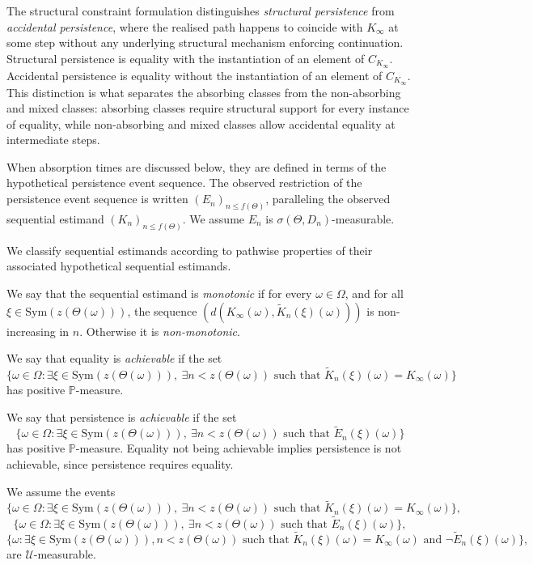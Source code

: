\documentclass{article}
\newcommand{\1}{\mathbbm{1}}
\begin{document}
The structural constraint formulation distinguishes \textit{structural persistence} from \textit{accidental persistence}, where the realised path happens to coincide with $K_\infty$ at some step without any underlying structural mechanism enforcing continuation. Structural persistence is equality with the instantiation of an element of $C_{K_\infty}$. Accidental persistence is equality without the instantiation of an element of $C_{K_\infty}$. This distinction is what separates the absorbing classes from the non-absorbing and mixed classes: absorbing classes require structural support for every instance of equality, while non-absorbing and mixed classes allow accidental equality at intermediate steps.

When absorption times are discussed below, they are defined in terms of the hypothetical persistence event sequence. The observed restriction of the persistence event sequence is written $(E_n)_{n \le f(\Theta)}$, paralleling the observed sequential estimand $(K_n)_{n \le f(\Theta)}$. We assume $E_n$ is $\sigma(\Theta,D_n)$-measurable.

We classify sequential estimands according to pathwise properties of their associated hypothetical sequential estimands.

We say that the sequential estimand is \textit{monotonic} if for every $\omega \in \Omega$, and for all $\xi \in \mathrm{Sym}(z(\Theta(\omega)))$, the sequence $(d(K_\infty(\omega), \widetilde K_n(\xi)(\omega)))$ is non-increasing in $n$. Otherwise it is \textit{non-monotonic}.

We say that equality is \textit{achievable} if the set
\[
\{\omega \in \Omega : \exists \xi \in \mathrm{Sym}(z(\Theta(\omega))),\ \exists n < z(\Theta(\omega)) \text{ such that } \widetilde K_n(\xi)(\omega) = K_\infty(\omega)\}
\]
has positive $\mathbb{P}$-measure.

We say that persistence is \textit{achievable} if the set
\[
\{\omega \in \Omega : \exists \xi \in \mathrm{Sym}(z(\Theta(\omega))),\ \exists n < z(\Theta(\omega)) \text{ such that } \widetilde E_n(\xi)(\omega)\}
\]
has positive $\mathbb{P}$-measure. Equality not being achievable implies persistence is not achievable, since persistence requires equality. 

We assume the events \[
\{\omega \in \Omega : \exists \xi \in \mathrm{Sym}(z(\Theta(\omega))),\ \exists n < z(\Theta(\omega)) \text{ such that } \widetilde K_n(\xi)(\omega) = K_\infty(\omega)\}, 
\]
\[
\{\omega \in \Omega : \exists \xi \in \mathrm{Sym}(z(\Theta(\omega))),\ \exists n < z(\Theta(\omega)) \text{ such that } \widetilde E_n(\xi)(\omega)\},
\]
\[
    \{\omega : \exists \xi \in \mathrm{Sym}(z(\Theta(\omega))), n < z(\Theta(\omega)) \text{ such that } \widetilde K_n(\xi)(\omega)=K_\infty(\omega) \text{ and } \lnot\widetilde E_n(\xi)(\omega)\},
\]
are $\mathcal{U}$-measurable. 
\end{document}
